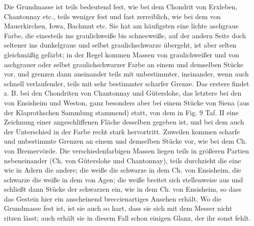 \documentclass[a4paper, 11pt, oneside]{article}
\begin{document}
Die Grundmasse ist teils bedeutend fest, wie bei dem Chondrit von Erxleben, Chantonnay etc., teils weniger fest und fast zerreiblich, wie bei dem von Mauerkirchen, Iowa, Bachmut etc. Sie hat am häufigsten eine lichte aschgraue Farbe, die einesteils ins graulichweiße bis schneeweiße, auf der andern Seite doch seltener ins dunkelgraue und selbst graulichschwarze übergeht, ist aber selten gleichmäßig gefärbt; in der Regel kommen Massen von graulichweißer und von aschgrauer oder selbst graulichschwarzer Farbe an einem und demselben Stücke vor, und grenzen dann aneinander teils mit unbestimmter, ineinander, wenn auch schnell verlaufender, teils mit sehr bestimmter scharfer Grenze. Das erstere findet z. B. bei den Chondriten von Chantonnay und Güterslohe, das letztere bei den von Ensisheim und Weston, ganz besonders aber bei einem Stücke von Siena (aus der Klaprothschen Sammlung stammend) statt, von dem in Fig. 9 Taf. II eine Zeichnung einer angeschliffenen Fläche desselben gegeben ist, und bei dem auch der Unterschied in der Farbe recht stark hervortritt. Zuweilen kommen scharfe und unbestimmte Grenzen an einem und demselben Stücke vor, wie bei dem Ch. von Bremervörde. Die verschiedenfarbigen Massen liegen teils in größeren Partien nebeneinander (Ch. von Güterslohe und Chantonnay), teils durchzieht die eine wie in Adern die andere; die weiße die schwarze in dem Ch. von Ensisheim, die schwarze die weiße in dem von Agen; die weiße breitet sich stellenweise aus und schließt dann Stücke der schwarzen ein, wie in dem Ch. von Ensisheim, so dass das Gestein hier ein anscheinend breccienartiges Ansehen erhält. Wo die Grundmasse fest ist, ist sie auch so hart, dass sie sich mit dem Messer nicht ritzen lässt; auch erhält sie in diesem Fall schon einigen Glanz, der ihr sonst fehlt.
\end{document}
